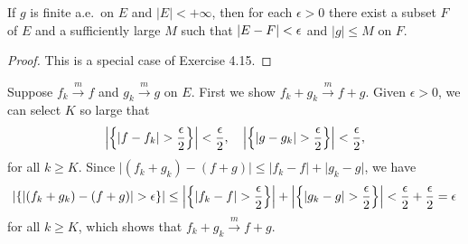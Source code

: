 \begin{lemma}
  If $g$ is finite a.e.\ on $E$ and $|E|<+\infty$,
  then for each $\epsilon > 0$
  there exist a subset $F$ of $E$ and a sufficiently large $M$ such that
  $\left\vert E - F\right\vert < \epsilon$ and $\lvert g \rvert \le M$ on $F$.
\end{lemma}
\begin{proof}
  This is a special case of Exercise 4.15.
\end{proof}

\begin{exercise}{4.17}
  Suppose $f_k \xrightarrow{m} f$ and $g_k \xrightarrow{m} g$ on $E$.
  First we show $f_k + g_k \xrightarrow{m} f+g$.
  Given $\epsilon > 0$,
  we can select $K$ so large that
  \[
    \left\vert\left\{ \lvert f - f_k \rvert > \frac{\epsilon}{2} \right\}\right\vert < \frac{\epsilon}{2},
    \quad
    \left\vert\left\{ \lvert g - g_k \rvert > \frac{\epsilon}{2} \right\}\right\vert < \frac{\epsilon}{2},
  \]
  for all $k \ge K$.
  Since $\lvert (f_k + g_k) - (f+g) \rvert \le
  \lvert f_k - f \rvert + \lvert g_k - g \rvert$,
  we have
  \[
    \left\vert\left\{ \lvert (f_k + g_k) - (f+g) \rvert > \epsilon \right\}\right\vert \le
    \left\vert\left\{ \lvert f_k - f \rvert > \frac{\epsilon}{2} \right\}\right\vert
    + \left\vert\left\{ \lvert g_k - g \rvert > \frac{\epsilon}{2} \right\}\right\vert
    < \frac{\epsilon}{2} + \frac{\epsilon}{2} = \epsilon
  \]
  for all $k \ge K$, which shows that $f_k + g_k \xrightarrow{m} f + g$.


\end{exercise}
